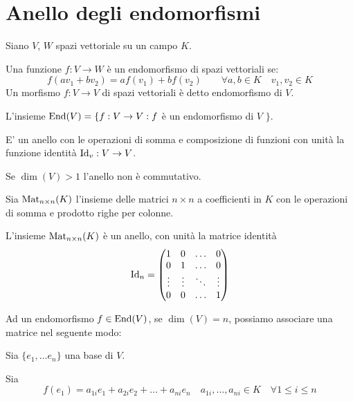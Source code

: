 \documentclass[../main.tex]{subfiles}
\begin{document}
\section{Anello degli endomorfismi}
\begin{definition}
    Siano $V$, $W$ spazi vettoriale su un campo $K$.

    Una funzione $f : V \rightarrow W$ è un endomorfismo di spazi vettoriali se:
    \begin{equation*}
        f(a v_1 + b v_2) = a f(v_1) + b f(v_2) \qquad \forall a,b \in K \quad v_1, v_2 \in K
    \end{equation*}
    Un morfismo $f: V \rightarrow V$ di spazi vettoriali è detto endomorfismo di $V$.

    L'insieme $\operatorname{End}(V) = \{ f : V \rightarrow V : f$ è un endomorfismo di $V$ $\}$.

    E' un anello con le operazioni di somma e composizione di funzioni con unità la funzione identità $\operatorname{Id}_v : V \rightarrow V$.

    Se $\dim(V) > 1$ l'anello non è commutativo.
\end{definition}

\begin{definition}
    Sia $\operatorname{Mat}_{n \times n}(K)$ l'insieme delle matrici $n \times n$ a coefficienti in $K$ con le operazioni di somma e prodotto righe per colonne.

    L'insieme $\operatorname{Mat}_{n \times n}(K)$ è un anello, con unità la matrice identità
    \begin{equation*}
        \operatorname{Id}_n = \begin{pmatrix}
            1      & 0      & \ldots & 0      \\
            0      & 1      & \ldots & 0      \\
            \vdots & \vdots & \ddots & \vdots \\
            0      & 0      & \ldots & 1
        \end{pmatrix}
    \end{equation*}
\end{definition}

Ad un endomorfismo $f \in \operatorname{End}(V)$, se $\dim(V) = n$, possiamo associare una matrice nel seguente modo:

Sia $\{e_1, \ldots e_n\}$ una base di $V$.

Sia
\begin{equation*}
    f(e_1) = a_{1i} e_1 + a_{2i} e_2 + \ldots + a_{ni} e_n \quad a_{1i},\ldots,a_{ni} \in K \quad \forall 1 \leq i \leq n
\end{equation*}
\end{document}
